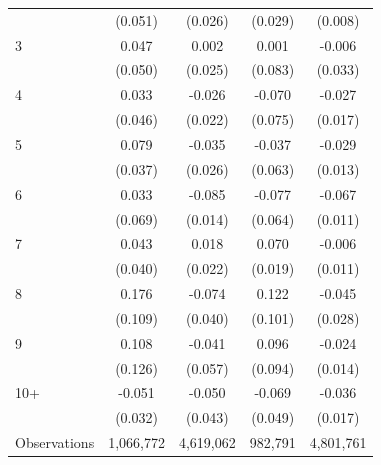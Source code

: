 \begin{table}[htbp]
\begin{tabular}{l*{4}{c}}
            &     (0.051)         &     (0.026)         &     (0.029)         &     (0.008)         \\
[1em]
3           &       0.047         &       0.002         &       0.001         &      -0.006         \\
            &     (0.050)         &     (0.025)         &     (0.083)         &     (0.033)         \\
[1em]
4           &       0.033         &      -0.026         &      -0.070         &      -0.027         \\
            &     (0.046)         &     (0.022)         &     (0.075)         &     (0.017)         \\
[1em]
5           &       0.079\sym{**} &      -0.035         &      -0.037         &      -0.029\sym{**} \\
            &     (0.037)         &     (0.026)         &     (0.063)         &     (0.013)         \\
[1em]
6           &       0.033         &      -0.085\sym{***}&      -0.077         &      -0.067\sym{***}\\
            &     (0.069)         &     (0.014)         &     (0.064)         &     (0.011)         \\
[1em]
7           &       0.043         &       0.018         &       0.070\sym{***}&      -0.006         \\
            &     (0.040)         &     (0.022)         &     (0.019)         &     (0.011)         \\
[1em]
8           &       0.176         &      -0.074\sym{*}  &       0.122         &      -0.045         \\
            &     (0.109)         &     (0.040)         &     (0.101)         &     (0.028)         \\
[1em]
9           &       0.108         &      -0.041         &       0.096         &      -0.024\sym{*}  \\
            &     (0.126)         &     (0.057)         &     (0.094)         &     (0.014)         \\
[1em]
10+         &      -0.051         &      -0.050         &      -0.069         &      -0.036\sym{**} \\
            &     (0.032)         &     (0.043)         &     (0.049)         &     (0.017)         \\
\hline
Observations&   1,066,772         &   4,619,062         &     982,791         &   4,801,761         \\

\end{tabular}
\end{table}
